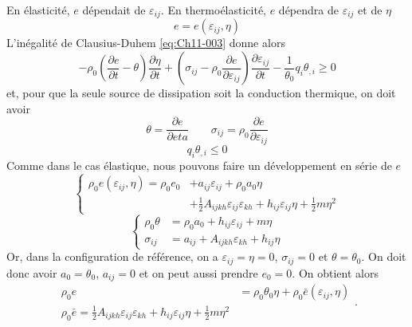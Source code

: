 En élasticité, $e$ dépendait de $\varepsilon_{ij}$. En thermoélasticité, $e$ dé­pendra de $\varepsilon_{ij}$ et de $\eta$ 
\begin{equation}
    e=e(\varepsilon_{ij},\eta)
    \label{eq:Ch11-004}
\end{equation}
L'inégalité de Clausius-Duhem \eqref{eq:Ch11-003} donne alors 
\begin{equation}
    -\rho_0 \left(\frac{\partial e}{\partial t} - \theta \right) \frac{\partial \eta}{\partial t} + \left(\sigma_{ij} -\rho_0\frac{\partial e}{\partial \varepsilon_{ij}}\right)\frac{\partial \varepsilon_{ij}}{\partial t} - \frac{1}{\theta_0} q_i \theta_{,i} \geq 0
    \label{eq:Ch11-005}
\end{equation}
et, pour que la seule source de dissipation soit la conduction thermique, on doit avoir 
\begin{equation}
    \theta=\frac{\partial e}{\partial eta}\qquad \sigma_{ij} =\rho_0\frac{\partial e}{\partial \varepsilon_{ij}}
    \label{eq:Ch11-006}
\end{equation}
\begin{equation}
    q_i \theta_{,i}\leq 0
    \label{eq:Ch11-007}
\end{equation}
Comme dans le cas élastique, nous pouvons faire un développement en série de $e$ 
\begin{equation}
  \left\{
  \begin{aligned}
    \rho_0 e(\varepsilon_{ij},\eta) = \rho_0 e_0 & + a_{ij} \varepsilon_{ij} +\rho_0 a_0 \eta \\
                                                 & + \frac{1}{2} A_{ijkh} \varepsilon_{ij}\varepsilon_{kh} + h_{ij} \varepsilon_{ij} \eta + \frac{1}{2} m \eta^2
  \end{aligned}
  \right.
    \label{eq:Ch11-008}
\end{equation}
\begin{equation}
  \left\{
  \begin{aligned}
    \rho_0 \theta & = \rho_0 a_0 + h_{ij} \varepsilon_{ij} + m \eta \\
    \sigma_{ij}   & = a_{ij} + A_{ijkh} \varepsilon_{kh} + h_{ij} \eta
  \end{aligned}
  \right.
    \label{eq:Ch11-009}
\end{equation}
Or, dans la configuration de référence, on a $\varepsilon_{ij}=\eta=0$, $\sigma_{ij}=0$ et $\theta=\theta_0$.
On doit donc avoir $a_0 = \theta_0$, $a_{ij}=0$ et on peut aussi prendre $e_0=0$. On obtient alors 
\begin{equation}
  \begin{aligned}
    \rho_0 e & = \rho_0 \theta_0 \eta + \rho_0 \bar{e}(\varepsilon_{ij},\eta) \\
    \rho_0 \bar{e} = \frac{1}{2} A_{ijkh} \varepsilon_{ij}\varepsilon_{kh} + h_{ij} \varepsilon_{ij}\eta + \frac{1}{2} m \eta^2
  \end{aligned}.
    \label{eq:Ch11-010}
\end{equation}
